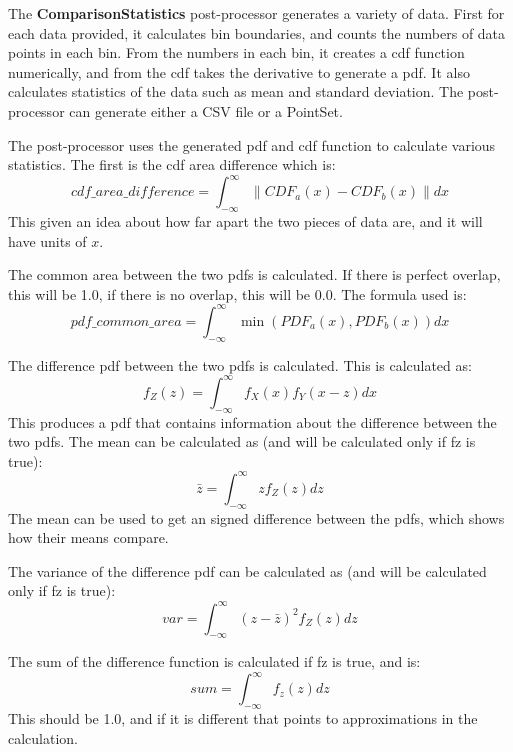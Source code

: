 The \textbf{ComparisonStatistics} post-processor generates a variety
of data.  First for each data provided, it calculates bin boundaries,
and counts the numbers of data points in each bin.  From the numbers
in each bin, it creates a cdf function numerically, and from the cdf
takes the derivative to generate a pdf.  It also calculates statistics
of the data such as mean and standard deviation. The post-processor
can generate either a CSV file or a PointSet.

The post-processor uses the generated pdf and cdf function to
calculate various statistics.  The first is the cdf area difference which is:
\begin{equation}
  cdf\_area\_difference = \int_{-\infty}^{\infty}{\|CDF_a(x)-CDF_b(x)\|dx}
\end{equation}
This given an idea about how far apart the two pieces of data are, and
it will have units of $x$.

The common area between the two pdfs is calculated.  If there is
perfect overlap, this will be 1.0, if there is no overlap, this will
be 0.0.  The formula used is:
\begin{equation}
  pdf\_common\_area = \int_{-\infty}^{\infty}{\min(PDF_a(x),PDF_b(x))}dx
\end{equation}

The difference pdf between the two pdfs is calculated.  This is calculated as:
\begin{equation}
  f_Z(z) = \int_{-\infty}^{\infty}f_X(x)f_Y(x-z)dx
\end{equation}
This produces a pdf that contains information about the difference
between the two pdfs.  The mean can be calculated as (and will be
calculated only if fz is true):
\begin{equation}
  \bar{z} = \int_{-\infty}^{\infty}{z f_Z(z)dz}
\end{equation}
The mean can be used to get an signed difference between the pdfs,
which shows how their means compare.

The variance of the difference pdf can be calculated as (and will be
calculated only if fz is true):
\begin{equation}
  var = \int_{-\infty}^{\infty}{(z-\bar{z})^2 f_Z(z)dz}
\end{equation}

The sum of the difference function is calculated if fz is true, and is:
\begin{equation}
  sum = \int_{-\infty}^{\infty}{f_z(z)dz}
\end{equation}
This should be 1.0, and if it is different that
points to approximations in the calculation.


